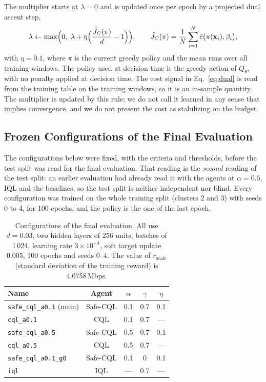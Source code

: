 The multiplier starts at $\lambda=0$ and is updated once per epoch by a projected dual ascent step,
\begin{equation}
  \lambda\leftarrow\max\Bigl(0,\ \lambda+\eta\Bigl(\frac{\hat J_C(\pi)}{d}-1\Bigr)\Bigr),\qquad
  \hat J_C(\pi)=\frac1N\sum_{i=1}^{N}\hat c\bigl(\pi(\mathbf{x}_i),\beta_i\bigr),
  \label{eq:dual}
\end{equation}%
with $\eta=0.1$, where $\pi$ is the current greedy policy and the mean runs over all training windows.%
The policy used at decision time is the greedy action of $Q_\theta$, with no penalty applied at decision time.%
The cost signal in Eq.~\eqref{eq:dual} is read from the training table on the training windows, so it is an in-sample quantity.%
The multiplier is updated by this rule; we do not call it learned in any sense that implies convergence, and we do not present the cost as stabilizing on the budget.%

\subsection{Frozen Configurations of the Final Evaluation}
\label{sec:configs}

The configurations below were fixed, with the criteria and thresholds, before the test split was read for the final evaluation.%
That reading is the \emph{second} reading of the test split: an earlier evaluation had already read it with the agents at $\alpha=0.5$, IQL and the baselines, so the test split is neither independent nor blind.%
Every configuration was trained on the whole training split (clusters 2 and 3) with seeds 0 to 4, for 100 epochs, and the policy is the one of the last epoch.%

\begin{table}[t]
\centering
\caption{Configurations of the final evaluation. All use $d=0.03$, two hidden layers of 256 units, batches of 1\,024, learning rate $3\times10^{-4}$, soft target update $0.005$, 100 epochs and seeds 0--4. The value of $r_{\mathrm{scale}}$ (standard deviation of the training reward) is 4.0758\,Mbps.}
\label{tab:configs}
\begin{tabular}{lcccc}
\hline
Name & Agent & $\alpha$ & $\gamma$ & $\eta$ \\
\hline
\texttt{safe\_cql\_a0.1} (main) & Safe-CQL & 0.1 & 0.7 & 0.1 \\
\texttt{cql\_a0.1} & CQL & 0.1 & 0.7 & --- \\
\texttt{safe\_cql\_a0.5} & Safe-CQL & 0.5 & 0.7 & 0.1 \\
\texttt{cql\_a0.5} & CQL & 0.5 & 0.7 & --- \\
\texttt{safe\_cql\_a0.1\_g0} & Safe-CQL & 0.1 & 0 & 0.1 \\
\texttt{iql} & IQL & --- & 0.7 & --- \\
\hline
\end{tabular}
\end{table}%


